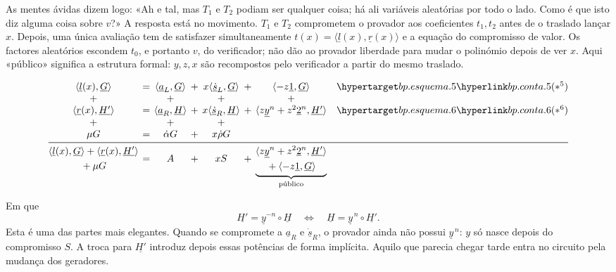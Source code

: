 \medskip
As mentes ávidas dizem logo: «Ah e tal, mas \(T_1\) e \(T_2\) podiam ser
qualquer coisa; há ali variáveis aleatórias por todo o lado. Como é que isto
diz alguma coisa sobre \(v\)?» A resposta está no movimento. \(T_1\) e \(T_2\)
comprometem o provador aos coeficientes \(t_1,t_2\) antes de o traslado lançar
\(x\). Depois, uma única avaliação tem de satisfazer simultaneamente
\(t(x)=\langle\underline l(x),\underline r(x)\rangle\) e a equação do
compromisso de valor. Os factores aleatórios escondem \(t_0\), e portanto \(v\),
do verificador; não dão ao provador liberdade para mudar o polinómio depois de
ver \(x\). Aqui «público» significa a estrutura formal: \(y,z,x\) são
recompostos pelo verificador a partir do mesmo traslado.

{\small
\[
\begingroup
\setlength{\arraycolsep}{2pt}
\begin{array}{@{}c c c c c c c@{\quad}c@{}}
 \langle\underline l(x),\underline G\rangle &=&
 \langle\underline a_L,\underline G\rangle &+&
 x\langle\underline{\dot s}_L,\underline G\rangle &+&
 \langle-z\underline1,\underline G\rangle &\bpesquema{5}\\
 + && + && + && +\\
 \langle\underline r(x),\underline{H'}\rangle &=&
 \langle\underline a_R,\underline H\rangle &+&
 x\langle\underline{\dot s}_R,\underline H\rangle &+&
 \langle z\underline y^n+z^2\underline2^n,\underline{H'}\rangle &\bpesquema{6}\\
 + && + && +\\
 \mu G &=& \dot\alpha G &+& x\dot\rho G\\
 \midrule
 \begin{gathered}
 \langle\underline l(x),\underline G\rangle+
 \langle\underline r(x),\underline{H'}\rangle\\{}+\mu G
 \end{gathered}
 &=& A &+& xS &+&
 \underbrace{\begin{gathered}
 \langle z\underline y^n+z^2\underline2^n,\underline{H'}\rangle\\
 {}+\langle-z\underline1,\underline G\rangle
 \end{gathered}}_{\text{público}}
\end{array}
\endgroup
\]
}

\medskip

Em que
\[
\underline{H'}=\underline y^{-n}\circ\underline H
\quad\Longleftrightarrow\quad
\underline H=\underline y^{\,n}\circ\underline{H'}.
\]
Esta é uma das partes mais elegantes. Quando se compromete a
\(\underline a_R\) e \(\underline{\dot s}_R\), o provador ainda não possui
\(\underline y^{\,n}\): \(y\) só nasce depois do compromisso \(S\). A troca
para \(\underline{H'}\) introduz depois essas potências de forma implícita.
Aquilo que parecia chegar tarde entra no circuito pela mudança dos geradores.

